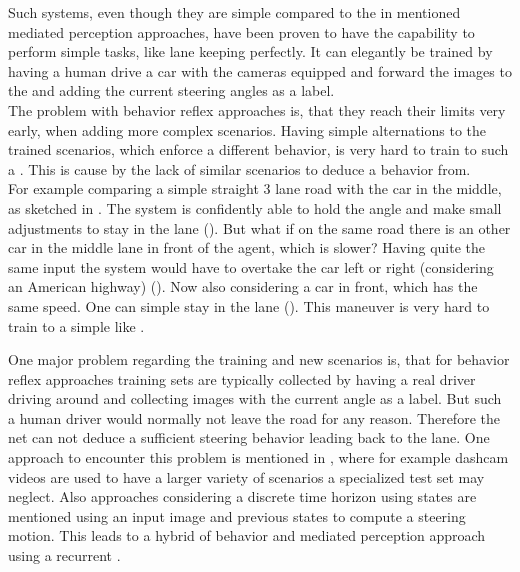 Such systems, even though they are simple compared to the in  mentioned mediated perception approaches, have been proven to have the capability to perform simple tasks, like lane keeping perfectly. It can elegantly be trained by having a human drive a car with the cameras equipped and forward the images to the \nn and adding the current steering angles as a label.\cite{chen2015deepdriving}\\

The problem with behavior reflex approaches is, that they reach their limits very early, when adding more complex scenarios. Having simple alternations to the trained scenarios, which enforce a different behavior, is very hard to train to such a \nn. This is cause by the lack of similar scenarios to deduce a behavior from.\\
For example comparing a simple straight 3 lane road with the car in the middle, as sketched in . The system is confidently able to hold the angle and make small adjustments to stay in the lane (). But what if on the same road there is an other car in the middle lane in front of the agent, which is slower? Having quite the same input the system would have to overtake the car left or right (considering an American highway) (). Now also considering a car in front, which has the same speed. One can simple stay in the lane (). This maneuver is very hard to train to a simple \nn like \alvinn.

One major problem regarding the training and new scenarios is, that for behavior reflex approaches training sets are typically collected by having a real driver driving around and collecting images with the current angle as a label. But such a human driver would normally not leave the road for any reason. Therefore the net can not deduce a sufficient steering behavior leading back to the lane. One approach to encounter this problem is mentioned in \cite{xu2017end}, where for example dashcam videos are used to have a larger variety of scenarios a specialized test set may neglect. Also approaches considering a discrete time horizon using states are mentioned using an input image and previous states to compute a steering motion. This leads to a hybrid of behavior and mediated perception approach using a recurrent \nn.



